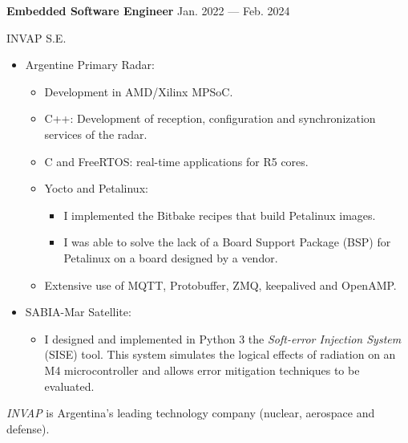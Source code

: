 \bigskip
\parbox[t][][t]{\linewidth}{
	\parbox{\linewidth}{
		\textbf{Embedded Software Engineer}
			\hfill
			{Jan. 2022 --- Feb. 2024}
		}
	\smallbreak
	\parbox{\linewidth}{INVAP S.E.}
	\smallbreak
	\begin{itemize}
		\item Argentine Primary Radar:
		\begin{itemize}
	    	\item{Development in AMD/Xilinx MPSoC.}
			\item{C++: Development of reception, configuration and synchronization services of the radar.}
			\item{C and FreeRTOS: real-time applications for R5 cores.}
			\item{Yocto and Petalinux:}
			\begin{itemize}
				\item{I implemented the Bitbake recipes that build Petalinux images.}
				\item{I was able to solve the lack of a Board Support Package (BSP) for Petalinux on a board designed by a vendor.}
			\end{itemize}
			\item{Extensive use of MQTT, Protobuffer, ZMQ, keepalived and OpenAMP.}
		\end{itemize}
		\item SABIA-Mar Satellite:
		\begin{itemize}
	    	\item{I designed and implemented in Python 3 the \emph{Soft-error Injection System} (SISE) tool. This system simulates the logical effects of radiation on an M4 microcontroller and allows error mitigation techniques to be evaluated.}
		\end{itemize}
	\end{itemize}
	\smallbreak
    \emph{INVAP} is Argentina's leading technology company (nuclear, aerospace and defense).
}

